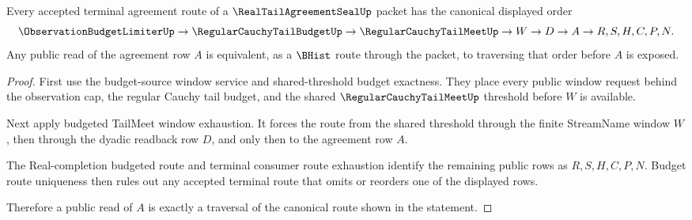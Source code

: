 \begin{theorem}
\label{thm:real-tail-agreement-seal-budget-route-canonical-form}
Every accepted terminal agreement route of a $\RealTailAgreementSealUp$ packet has the canonical displayed order
$$
\ObservationBudgetLimiterUp \to \RegularCauchyTailBudgetUp \to \RegularCauchyTailMeetUp \to W \to D \to A \to R,S,H,C,P,N.
$$
Any public read of the agreement row $A$ is equivalent, as a $\BHist$ route through the packet, to traversing that order before $A$ is exposed.
\end{theorem}
\begin{proof}
First use the budget-source window service and shared-threshold budget exactness. They place every public window request behind the observation cap, the regular Cauchy tail budget, and the shared $\RegularCauchyTailMeetUp$ threshold before $W$ is available.

Next apply budgeted TailMeet window exhaustion. It forces the route from the shared threshold through the finite StreamName window $W$, then through the dyadic readback row $D$, and only then to the agreement row $A$.

The Real-completion budgeted route and terminal consumer route exhaustion identify the remaining public rows as $R,S,H,C,P,N$. Budget route uniqueness then rules out any accepted terminal route that omits or reorders one of the displayed rows.

Therefore a public read of $A$ is exactly a traversal of the canonical route shown in the statement.
\end{proof}

